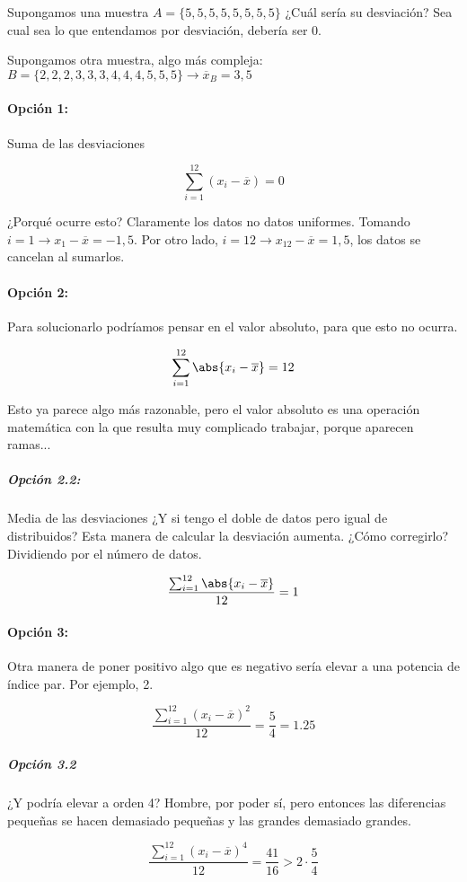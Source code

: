 Supongamos una muestra $A=\{5,5,5,5,5,5,5,5\}$ ¿Cuál sería su desviación? Sea cual sea lo que entendamos por desviación, debería ser 0.

Supongamos otra muestra, algo más compleja: $B = \{ 2,2,2,3,3,3,4,4,4,5,5,5 \} \to \overline{x}_B=3,5$
\paragraph{Opción 1:} Suma de las desviaciones

\[ \sum_{i=1}^{12} (x_i-\overline{x}) = 0\]

¿Porqué ocurre esto? Claramente los datos no datos uniformes. Tomando $i=1\to x_1-\overline{x} = -1,5$. Por otro lado, $i=12 \to x_{12}-\overline{x} = 1,5$, los datos se cancelan al sumarlos.

\paragraph{Opción 2:} Para solucionarlo podríamos pensar en el valor absoluto, para que esto no ocurra.

\[ \sum_{i=1}^{12} \abs{x_i-\overline{x}} = 12\]

Esto ya parece algo más razonable, pero el valor absoluto es una operación matemática con la que resulta muy complicado trabajar, porque aparecen ramas... 

\subparagraph{Opción 2.2: } Media de las desviaciones ¿Y si tengo el doble de datos pero igual de distribuidos?  Esta manera de calcular la desviación aumenta. ¿Cómo corregirlo? Dividiendo por el número de datos.

\[ \frac{\sum_{i=1}^{12} \abs{x_i-\overline{x}}}{12} = 1\]

\paragraph{Opción 3:} Otra manera de poner positivo algo que es negativo sería elevar a una potencia de índice par. Por ejemplo, 2.

\[ \frac{\sum_{i=1}^{12} \left(x_i-\overline{x}\right)^2}{12} = \frac{5}{4} = 1.25\]

\subparagraph{Opción 3.2} ¿Y podría elevar a orden 4? Hombre, por poder sí, pero entonces las diferencias pequeñas se hacen demasiado pequeñas y las grandes demasiado grandes.

\[ \frac{\sum_{i=1}^{12} \left(x_i-\overline{x}\right)^4}{12} = \frac{41}{16} > 2·\frac{5}{4}\]


